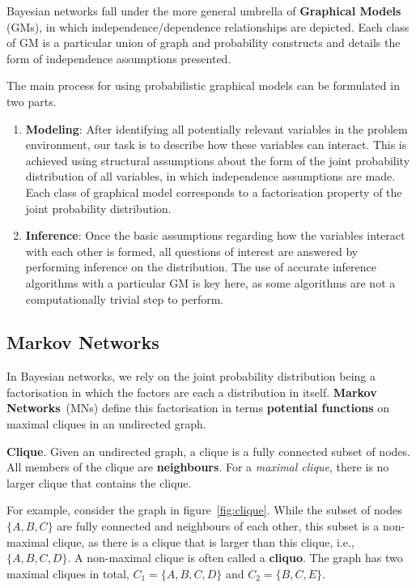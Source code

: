 \documentclass{article}
\begin{document}
Bayesian networks fall under the more general umbrella of \textbf{Graphical Models} (GMs), in which independence/dependence relationships are depicted. Each class of GM is a particular union of graph and probability constructs and details the form of independence assumptions presented. 

\noindent The main process for using probabilistic graphical models can be formulated in two parts. 
\begin{enumerate}
    \item \textbf{Modeling}: After identifying all potentially relevant variables in the problem environment, our task is to describe how these variables can interact. This is achieved using structural assumptions about the form of the joint probability distribution of all variables, in which independence assumptions are made. Each class of graphical model corresponds to a factorisation property of the joint probability distribution. 
    \item \textbf{Inference}: Once the basic assumptions regarding how the variables interact with each other is formed, all questions of interest are answered by performing inference on the distribution. The use of accurate inference algorithms with a particular GM is key here, as some algorithms are not a computationally trivial step to perform. 
\end{enumerate}

\subsection{Markov Networks}

In Bayesian networks, we rely on the joint probability distribution being a factorisation in which the factors are each a distribution in itself. \textbf{Markov Networks}~(MNs) define this factorisation in terms \textbf{potential functions} on maximal cliques in an undirected graph.
\\
\begin{theorem}
    \textbf{Clique}. Given an undirected graph, a clique is a fully connected subset of nodes. All members of the clique are \textbf{neighbours}. For a \textit{maximal clique}, there is no larger clique that contains the clique. 
\end{theorem}

\noindent For example, consider the graph in figure~\ref{fig:clique}. While the subset of nodes $\{A, B, C\}$ are fully connected and neighbours of each other, this subset is a non-maximal clique, as there is a clique that is larger than this clique, i.e., $\{A, B, C, D\}$. A non-maximal clique is often called a \textbf{cliquo}. The graph has two maximal cliques in total, $C_1 = \{A, B, C, D\}$ and $C_2 = \{B, C, E\}$. 
\end{document}
